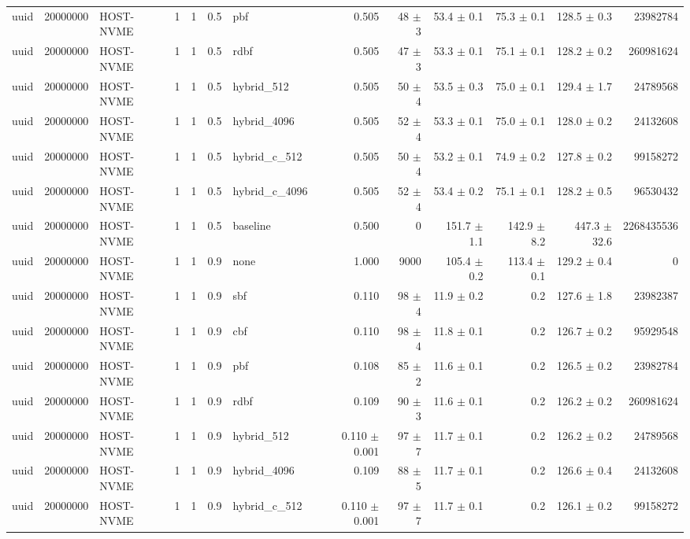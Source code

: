 \begin{tabular}{lllllllrrrrrr}
uuid & 20000000 & HOST-NVME & 1 & 1 & 0.5 & pbf & 0.505 & 48 $\pm$ 3 & 53.4 $\pm$ 0.1 & 75.3 $\pm$ 0.1 & 128.5 $\pm$ 0.3 & 23982784 \\
uuid & 20000000 & HOST-NVME & 1 & 1 & 0.5 & rdbf & 0.505 & 47 $\pm$ 3 & 53.3 $\pm$ 0.1 & 75.1 $\pm$ 0.1 & 128.2 $\pm$ 0.2 & 260981624 \\
uuid & 20000000 & HOST-NVME & 1 & 1 & 0.5 & hybrid\_512 & 0.505 & 50 $\pm$ 4 & 53.5 $\pm$ 0.3 & 75.0 $\pm$ 0.1 & 129.4 $\pm$ 1.7 & 24789568 \\
uuid & 20000000 & HOST-NVME & 1 & 1 & 0.5 & hybrid\_4096 & 0.505 & 52 $\pm$ 4 & 53.3 $\pm$ 0.1 & 75.0 $\pm$ 0.1 & 128.0 $\pm$ 0.2 & 24132608 \\
uuid & 20000000 & HOST-NVME & 1 & 1 & 0.5 & hybrid\_c\_512 & 0.505 & 50 $\pm$ 4 & 53.2 $\pm$ 0.1 & 74.9 $\pm$ 0.2 & 127.8 $\pm$ 0.2 & 99158272 \\
uuid & 20000000 & HOST-NVME & 1 & 1 & 0.5 & hybrid\_c\_4096 & 0.505 & 52 $\pm$ 4 & 53.4 $\pm$ 0.2 & 75.1 $\pm$ 0.1 & 128.2 $\pm$ 0.5 & 96530432 \\
uuid & 20000000 & HOST-NVME & 1 & 1 & 0.5 & baseline & 0.500 & 0 & 151.7 $\pm$ 1.1 & 142.9 $\pm$ 8.2 & 447.3 $\pm$ 32.6 & 2268435536 \\
uuid & 20000000 & HOST-NVME & 1 & 1 & 0.9 & none & 1.000 & 9000 & 105.4 $\pm$ 0.2 & 113.4 $\pm$ 0.1 & 129.2 $\pm$ 0.4 & 0 \\
uuid & 20000000 & HOST-NVME & 1 & 1 & 0.9 & sbf & 0.110 & 98 $\pm$ 4 & 11.9 $\pm$ 0.2 & 0.2 & 127.6 $\pm$ 1.8 & 23982387 \\
uuid & 20000000 & HOST-NVME & 1 & 1 & 0.9 & cbf & 0.110 & 98 $\pm$ 4 & 11.8 $\pm$ 0.1 & 0.2 & 126.7 $\pm$ 0.2 & 95929548 \\
uuid & 20000000 & HOST-NVME & 1 & 1 & 0.9 & pbf & 0.108 & 85 $\pm$ 2 & 11.6 $\pm$ 0.1 & 0.2 & 126.5 $\pm$ 0.2 & 23982784 \\
uuid & 20000000 & HOST-NVME & 1 & 1 & 0.9 & rdbf & 0.109 & 90 $\pm$ 3 & 11.6 $\pm$ 0.1 & 0.2 & 126.2 $\pm$ 0.2 & 260981624 \\
uuid & 20000000 & HOST-NVME & 1 & 1 & 0.9 & hybrid\_512 & 0.110 $\pm$ 0.001 & 97 $\pm$ 7 & 11.7 $\pm$ 0.1 & 0.2 & 126.2 $\pm$ 0.2 & 24789568 \\
uuid & 20000000 & HOST-NVME & 1 & 1 & 0.9 & hybrid\_4096 & 0.109 & 88 $\pm$ 5 & 11.7 $\pm$ 0.1 & 0.2 & 126.6 $\pm$ 0.4 & 24132608 \\
uuid & 20000000 & HOST-NVME & 1 & 1 & 0.9 & hybrid\_c\_512 & 0.110 $\pm$ 0.001 & 97 $\pm$ 7 & 11.7 $\pm$ 0.1 & 0.2 & 126.1 $\pm$ 0.2 & 99158272 \\

\end{tabular}

